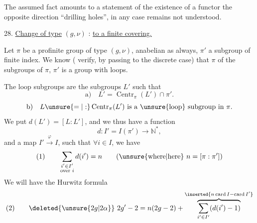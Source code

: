 The assumed fact amounts to a statement of the existence of a functor  the opposite direction ``drilling holes'',  in any case remains not understood.



28. \uline{Change of type} $(g,\nu)$  : \uline{ to a finite covering.}

Let $\pi$ be a profinite group  of type $(g,\nu)$, anabelian as always, $\pi'$ a subgroup of finite index. We know ( verify, by passing to the discrete case) that     $\pi$ of the  subgroups of $\pi$, $\pi'$ is a group with loops.


The loop subgroups are  the  subgroups $L'$ such that
\[
\text{a)}\quad L'=\operatorname{Centr}_{\pi}(L')\cap\pi'.
\]
\[
\text{b)}\quad L\unsure{=|:}\operatorname{Centr}_{\pi}(L')\text{ is a \unsure{loop} subgroup in }\pi.
\]
We put $d(L')=[L:L']$, and we thus have a function
\[
d:I'=I(\pi')\longrightarrow\mathbb N^*,
\]
and a map $I'\xrightarrow{\varphi}I$, such that $\forall i\in I$, we have
\[
\text{(1)}\qquad \sum_{\substack{i'\in I'\\\text{over }i}}d(i')=n
\qquad (\text{\unsure{where|here}}\ n=[\pi:\pi'])
\]
We will have the Hurwitz formula
\[
\text{(2)}\qquad \deleted{\unsure{2g|2\alpha}}\ 2g'-2=n(2g-2)+\overbrace{\sum_{i'\in I'}(d(i')-1)}^{\inserted{n\operatorname{card}I-\operatorname{card}I'}}
\]
